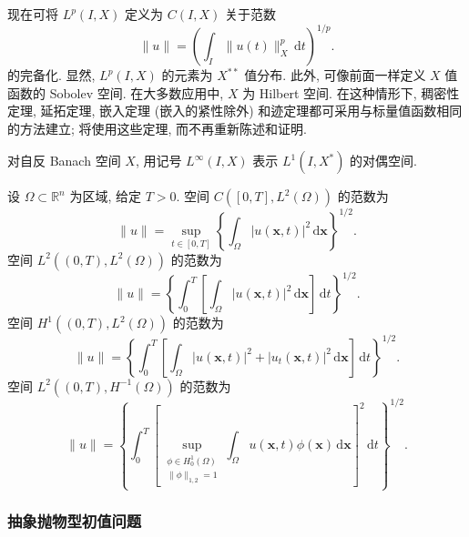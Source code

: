 现在可将 $L^p(I,X)$ 定义为 $C(I,X)$ 关于范数
\begin{equation}\label{eq:banach-valued-lp-completion-norm}
\|u\|=\left(\int_I\|u(t)\|_X^p\,\mathrm{d}t\right)^{1/p}.
\end{equation}
的完备化. 显然, $L^p(I,X)$ 的元素为 $X^{**}$ 值分布. 此外, 可像前面一样定义 $X$ 值函数的 Sobolev 空间. 在大多数应用中, $X$ 为 Hilbert 空间. 在这种情形下, 稠密性定理, 延拓定理, 嵌入定理 (嵌入的紧性除外) 和迹定理都可采用与标量值函数相同的方法建立; 将使用这些定理, 而不再重新陈述和证明.\par 对自反 Banach 空间 $X$, 用记号 $L^\infty(I,X)$ 表示 $L^1(I,X^*)$ 的对偶空间.

\begin{Example}
\label{ex:time-spatial-function-spaces-norms}
设 $\Omega\subset\mathbb{R}^n$ 为区域, 给定 $T>0$. 空间 $C([0,T],L^2(\Omega))$ 的范数为
\begin{equation}\label{eq:time-continuous-ltwo-spatial-function-norm}
\|u\|=\sup_{t\in[0,T]}\left\{\int_\Omega|u(\bm{x},t)|^2\,\mathrm{d}\bm{x}\right\}^{1/2}.
\end{equation}
空间 $L^2((0,T),L^2(\Omega))$ 的范数为
\begin{equation}\label{eq:time-ltwo-ltwo-spatial-function-norm}
\|u\|=\left\{\int_0^T\left[\int_\Omega|u(\bm{x},t)|^2\,\mathrm{d}\bm{x}\right]\,\mathrm{d}t\right\}^{1/2}.
\end{equation}
空间 $H^1((0,T),L^2(\Omega))$ 的范数为
\begin{equation}\label{eq:time-hone-ltwo-spatial-function-norm}
\|u\|=\left\{\int_0^T\left[\int_\Omega|u(\bm{x},t)|^2+|u_t(\bm{x},t)|^2\,\mathrm{d}\bm{x}\right]\,\mathrm{d}t\right\}^{1/2}.
\end{equation}
空间 $L^2((0,T),H^{-1}(\Omega))$ 的范数为
\begin{equation}\label{eq:time-ltwo-negative-spatial-sobolev-norm}
\|u\|=\left\{\int_0^T\left[\sup_{\substack{\phi\in H_0^1(\Omega)\\\|\phi\|_{1,2}=1}}\int_\Omega u(\bm{x},t)\phi(\bm{x})\,\mathrm{d}\bm{x}\right]^2\,\mathrm{d}t\right\}^{1/2}.
\end{equation}

\end{Example}

\subsubsection{抽象抛物型初值问题}\label{subsec:abstract-parabolic-initial-value-problems}

